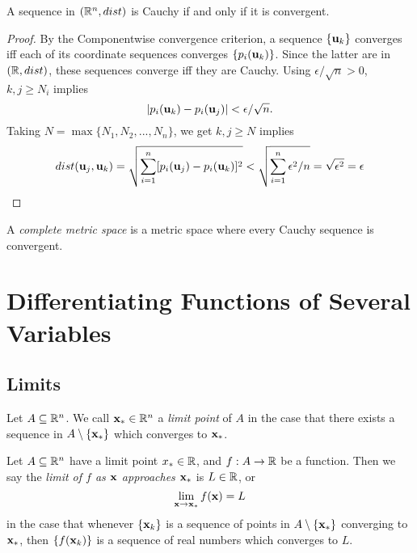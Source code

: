 \documentclass[letterpaper, twoside, 12pt]{book}
\begin{document}
\begin{corollary}[Example 12.16]
  A sequence in \((\mathbb R^n,dist)\) is Cauchy if and only if it is convergent.
\end{corollary}

\begin{proof}
    By the Componentwise convergence criterion, a sequence \(\{\mathbf u_k\}\) converges
    iff each of its coordinate sequences converges \(\{p_i(\mathbf u_k)\}\). Since the latter
    are in \((\mathbb R, dist)\), these sequences converge iff they are Cauchy. Using 
    \(\epsilon / \sqrt{n} > 0\), \(k, j \geq N_i\) implies 
    \[ |p_i(\mathbf u_k) - p_i(\mathbf u_j)| < \epsilon/ \sqrt{n} . \]
    Taking \(N = \max\{N_1, N_2, ..., N_n\}\), we get \(k, j \geq N\) implies
    \[ dist(\mathbf u_j, \mathbf u_k) = \sqrt{\sum_{i = 1}^n [p_i(\mathbf u_j) - p_i(\mathbf u_k)]^2} 
    < \sqrt{ \sum_{i = 1}^n \epsilon^2/n } = \sqrt{\epsilon^2} = \epsilon \]
    
\end{proof}

\begin{definition}
  A \textit{complete metric space} is a metric space where every
  Cauchy sequence is convergent.
\end{definition}




\chapter{Differentiating Functions of Several Variables}


\section{Limits}

\begin{definition}
  Let \(A\subseteq\mathbb R^n\). We call \(\mathbf x_*\in\mathbb R^n\) a
  \textit{limit point} of \(A\) in the case that there exists a sequence
  in \(A\setminus\{\mathbf x_*\}\) which converges to \(\mathbf x_*\).
\end{definition}

\begin{definition}
  Let \(A\subseteq\mathbb R^n\) have a limit point \(x_*\in\mathbb R\), and
  \(f:A\to\mathbb R\) be a function. Then we say the
  \textit{limit of \(f\) as \(\mathbf x\) approaches \(\mathbf x_*\)}
  is \(L\in\mathbb R\), or
  \[
    \lim_{\mathbf x\to\mathbf x_*} f(\mathbf x)
      =
    L
  \]
  in the case that whenever \(\{\mathbf x_k\}\) is a sequence of points in
  \(A\setminus\{\mathbf x_*\}\) converging to \(\mathbf x_*\),
  then \(\{f(\mathbf x_k)\}\) is a sequence of real numbers which
  converges to \(L\).
\end{definition}
\end{document}
